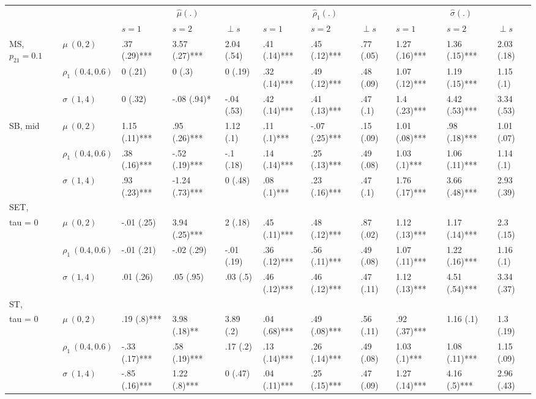 \begin{table}[t]
\fontsize{12.0pt}{14.0pt}\selectfont
\begin{tabular*}{\linewidth}{@{\extracolsep{\fill}}l|l|lllllllll}
\toprule
\multicolumn{2}{l}{} & \multicolumn{3}{c}{{\(\hat{\mu}(.)\)}} & \multicolumn{3}{c}{{\(\hat{\rho}_1(.)\)}} & \multicolumn{3}{c}{{\(\hat{\sigma}(.)\)}} \\ 
\cmidrule(lr){3-5} \cmidrule(lr){6-8} \cmidrule(lr){9-11}
\multicolumn{2}{c}{} & \(s = 1\) & \(s = 2\) & \(\perp s\) & \(s = 1\) & \(s = 2\) & \(\perp s\) & \(s = 1\) & \(s = 2\) & \(\perp s\) \\ 
\midrule\addlinespace[2.5pt]
MS, \(p_{21} = 0.1\) & \(\mu ~ (0, 2)\) & .37 (.29)*** & 3.57 (.27)*** & 2.04 (.54) & .41 (.14)*** & .45 (.12)*** & .77 (.05) & 1.27 (.16)*** & 1.36 (.15)*** & 2.03 (.18) \\ 
 & \(\rho_{1} ~ (0.4, 0.6)\) & 0 (.21) & 0 (.3) & 0 (.19) & .32 (.14)*** & .49 (.12)*** & .48 (.09) & 1.07 (.12)*** & 1.19 (.15)*** & 1.15 (.1) \\ 
 & \(\sigma ~ (1, 4)\) & 0 (.32) & -.08 (.94)* & -.04 (.53) & .42 (.14)*** & .41 (.13)*** & .47 (.1) & 1.4 (.23)*** & 4.42 (.53)*** & 3.34 (.53) \\ 
SB, mid & \(\mu ~ (0, 2)\) & 1.15 (.11)*** & .95 (.26)*** & 1.12 (.1) & .11 (.1)*** & -.07 (.25)*** & .15 (.09) & 1.01 (.08)*** & .98 (.18)*** & 1.01 (.07) \\ 
 & \(\rho_{1} ~ (0.4, 0.6)\) & .38 (.16)*** & -.52 (.19)*** & -.1 (.18) & .14 (.14)*** & .25 (.13)*** & .49 (.08) & 1.03 (.1)*** & 1.06 (.11)*** & 1.14 (.1) \\ 
 & \(\sigma ~ (1, 4)\) & .93 (.23)*** & -1.24 (.73)*** & 0 (.48) & .08 (.1)*** & .23 (.16)*** & .47 (.1) & 1.76 (.17)*** & 3.66 (.48)*** & 2.93 (.39) \\ 
SET, \(\\tau = 0\) & \(\mu ~ (0, 2)\) & -.01 (.25) & 3.94 (.25)*** & 2 (.18) & .45 (.11)*** & .48 (.12)*** & .87 (.02) & 1.12 (.13)*** & 1.17 (.14)*** & 2.3 (.15) \\ 
 & \(\rho_{1} ~ (0.4, 0.6)\) & -.01 (.21) & -.02 (.29) & -.01 (.19) & .36 (.12)*** & .56 (.11)*** & .49 (.08) & 1.07 (.11)*** & 1.22 (.16)*** & 1.16 (.1) \\ 
 & \(\sigma ~ (1, 4)\) & .01 (.26) & .05 (.95) & .03 (.5) & .46 (.12)*** & .46 (.12)*** & .47 (.11) & 1.12 (.13)*** & 4.51 (.54)*** & 3.34 (.37) \\ 
ST, \(\\tau = 0\) & \(\mu ~ (0, 2)\) & .19 (.8)*** & 3.98 (.18)** & 3.89 (.2) & .04 (.68)*** & .49 (.08)*** & .56 (.11) & .92 (.37)*** & 1.16 (.1) & 1.3 (.19) \\ 
 & \(\rho_{1} ~ (0.4, 0.6)\) & -.33 (.17)*** & .58 (.19)*** & .17 (.2) & .13 (.14)*** & .26 (.14)*** & .49 (.08) & 1.03 (.1)*** & 1.08 (.11)*** & 1.15 (.09) \\ 
 & \(\sigma ~ (1, 4)\) & -.85 (.16)*** & 1.22 (.8)*** & 0 (.47) & .04 (.11)*** & .25 (.15)*** & .47 (.09) & 1.27 (.14)*** & 4.16 (.5)*** & 2.96 (.43) \\ 
\bottomrule
\end{tabular*}
\end{table}

